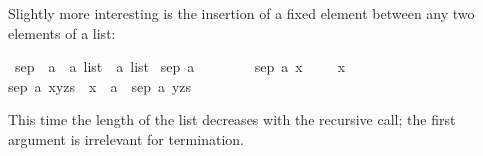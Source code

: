 \begin{isabellebody}
\begin{isamarkuptext}
Slightly more interesting is the insertion of a fixed element
between any two elements of a list:%
\end{isamarkuptext}%
\isamarkuptrue%
\isamarkupfalse%
\ sep\ {}{}\ {}{}a\ {}\ {}a\ list\ {}\ {}a\ list{}\ \isanewline
{}sep\ a\ {}{}\ \ \ \ \ {}\ {}{}{}\ {}\isanewline
{}sep\ a\ {}x{}\ \ \ \ {}\ {}x{}{}\ {}\isanewline
{}sep\ a\ {}x{}y{}zs{}\ {}\ x\ {}\ a\ {}\ sep\ a\ {}y{}zs{}{}%
\begin{isamarkuptext}%
\noindent
This time the length of the list decreases with the
recursive call; the first argument is irrelevant for termination.


\end{isamarkuptext}
\end{isabellebody}
